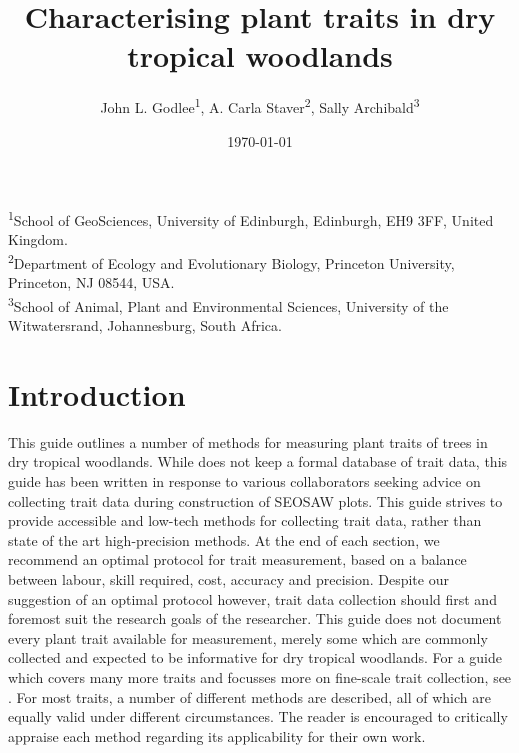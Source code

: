 \documentclass[11pt,a4paper]{article}
\title{Characterising plant traits in dry tropical woodlands}
\author{John L. Godlee\textsuperscript{1}, A. Carla Staver\textsuperscript{2}, Sally Archibald\textsuperscript{3}}
\date{\today{}}
\begin{document}
\maketitle{}

\textsuperscript{1}School of GeoSciences, University of Edinburgh, Edinburgh, EH9 3FF, United Kingdom. \\
\textsuperscript{2}Department of Ecology and Evolutionary Biology, Princeton University, Princeton, NJ 08544, USA. \\
\textsuperscript{3}School of Animal, Plant and Environmental Sciences, University of the Witwatersrand, Johannesburg, South Africa.

\tableofcontents{}

\section{Introduction}

This guide outlines a number of methods for measuring plant traits of trees in dry tropical woodlands. While \citet{SEOSAW} does not keep a formal database of trait data, this guide has been written in response to various collaborators seeking advice on collecting trait data during construction of SEOSAW plots. This guide strives to provide accessible and low-tech methods for collecting trait data, rather than state of the art high-precision methods. At the end of each section, we recommend an optimal protocol for trait measurement, based on a balance between labour, skill required, cost, accuracy and precision. Despite our suggestion of an optimal protocol however, trait data collection should first and foremost suit the research goals of the researcher. This guide does not document every plant trait available for measurement, merely some which are commonly collected and expected to be informative for dry tropical woodlands. For a guide which covers many more traits and focusses more on fine-scale trait collection, see \citet{Wigley2020}. For most traits, a number of different methods are described, all of which are equally valid under different circumstances. The reader is encouraged to critically appraise each method regarding its applicability for their own work. 
\end{document}
